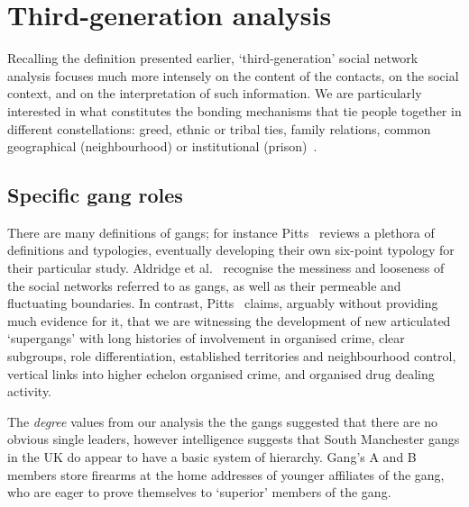 \documentclass[conference]{IEEEtran}
\theoremstyle{definition}
\begin{document}

\section{Third-generation analysis}\label{sec:thirdanalysis}
Recalling the definition presented earlier, `third-generation' social
network analysis focuses much more intensely on the content of the
contacts, on the social context, and on the interpretation of such
information. We are particularly interested in what constitutes the
bonding mechanisms that tie people together in different
constellations: greed, ethnic or tribal ties, family relations, common
geographical (neighbourhood) or institutional
(prison)~\cite{Klerks2001}.


\subsection{Specific gang roles}\label{sec:shortestpaths}
There are many definitions of gangs; for instance
Pitts~\cite{pitts:2007} reviews a plethora of definitions and
typologies, eventually developing their own six-point typology for
their particular study.  Aldridge et al.~\cite{aldridge-et-al:2008}
recognise the messiness and looseness of the social networks referred
to as gangs, as well as their permeable and fluctuating boundaries.
In contrast, Pitts~\cite{pitts:2008} claims, arguably without
providing much evidence for it, that we are witnessing the development
of new articulated `supergangs' with long histories of involvement in
organised crime, clear subgroups, role differentiation, established
territories and neighbourhood control, vertical links into higher
echelon organised crime, and organised drug dealing activity.

The \emph{degree} values from our analysis the the gangs suggested
that there are no obvious single leaders, however intelligence
suggests that South Manchester gangs in the UK do appear to have a
basic system of hierarchy. Gang's A and B members store firearms at
the home addresses of younger affiliates of the gang, who are eager to
prove themselves to `superior' members of the gang. 
\end{document}
